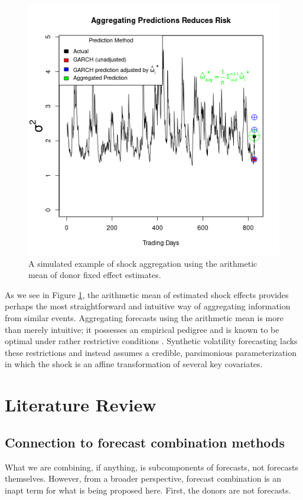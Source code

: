 \documentclass[11pt]{article}
\theoremstyle{definition}
\begin{document}
\begin{figure}[h]
\begin{center}
  \includegraphics[scale=.5]{simulation_plots/USE_in_paper_simulation_plot_arithmetic_mean.png}
  \caption{A simulated example of shock aggregation using the arithmetic mean of donor fixed effect estimates.}
  \label{fig:arith_mean}
  \end{center}
\end{figure}

As we see in Figure \ref{fig:arith_mean}, the arithmetic mean of estimated shock effects provides perhaps the most straightforward and intuitive way of aggregating information from similar events. Aggregating forecasts using the arithmetic mean is more than merely intuitive; it possesses an empirical pedigree and is known to be optimal under rather restrictive conditions \citep{timmermann2006forecast}.  Synthetic volatility forecasting lacks these restrictions and instead assumes a credible, parsimonious parameterization in which the shock is an affine transformation of several key covariates. \\

\section{Literature Review}

\subsection{Connection to forecast combination methods}
What we are combining, if anything, is subcomponents of forecasts, not forecasts themselves.  However, from a broader perspective, forecast combination is an inapt term for what is being proposed here.  First, the donors are not forecasts. 
\end{document}
